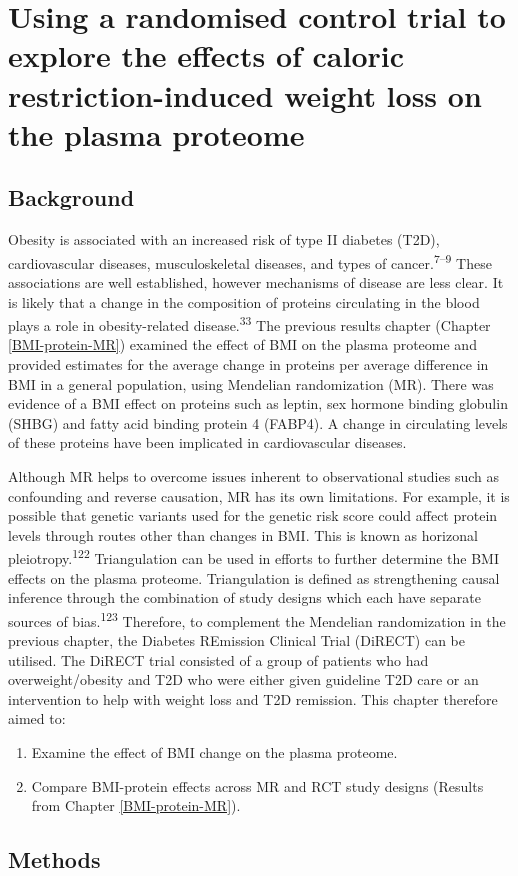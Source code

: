 \documentclass[11pt,twoside]{bristolthesis}
\providecommand{\tightlist}{%
  \setlength{\itemsep}{0pt}\setlength{\parskip}{0pt}}
\begin{document}
\hypertarget{BMI-protein-RCT}{%
\chapter{Using a randomised control trial to explore the effects of caloric restriction-induced weight loss on the plasma proteome}\label{BMI-protein-RCT}}

\hypertarget{background-4}{%
\section{Background}\label{background-4}}

Obesity is associated with an increased risk of type II diabetes (T2D), cardiovascular diseases, musculoskeletal diseases, and types of cancer.\textsuperscript{7--9} These associations are well established, however mechanisms of disease are less clear. It is likely that a change in the composition of proteins circulating in the blood plays a role in obesity-related disease.\textsuperscript{33} The previous results chapter (Chapter \ref{BMI-protein-MR}) examined the effect of BMI on the plasma proteome and provided estimates for the average change in proteins per average difference in BMI in a general population, using Mendelian randomization (MR). There was evidence of a BMI effect on proteins such as leptin, sex hormone binding globulin (SHBG) and fatty acid binding protein 4 (FABP4). A change in circulating levels of these proteins have been implicated in cardiovascular diseases.

Although MR helps to overcome issues inherent to observational studies such as confounding and reverse causation, MR has its own limitations. For example, it is possible that genetic variants used for the genetic risk score could affect protein levels through routes other than changes in BMI. This is known as horizonal pleiotropy.\textsuperscript{122} Triangulation can be used in efforts to further determine the BMI effects on the plasma proteome. Triangulation is defined as strengthening causal inference through the combination of study designs which each have separate sources of bias.\textsuperscript{123} Therefore, to complement the Mendelian randomization in the previous chapter, the Diabetes REmission Clinical Trial (DiRECT) can be utilised. The DiRECT trial consisted of a group of patients who had overweight/obesity and T2D who were either given guideline T2D care or an intervention to help with weight loss and T2D remission. This chapter therefore aimed to:
\begin{enumerate}
\def\labelenumi{\arabic{enumi})}
\tightlist
\item
  Examine the effect of BMI change on the plasma proteome.
\item
  Compare BMI-protein effects across MR and RCT study designs (Results from Chapter \ref{BMI-protein-MR}).
\end{enumerate}
\hypertarget{methods-4}{%
\section{Methods}\label{methods-4}}
\end{document}
